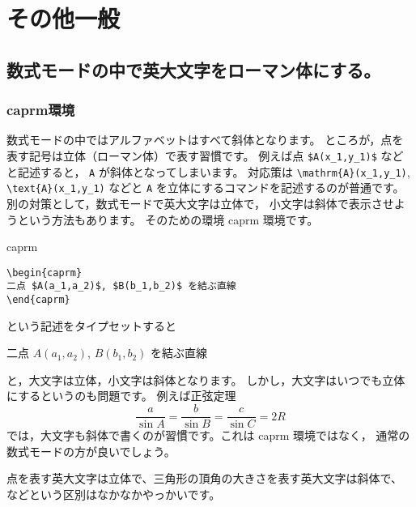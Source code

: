\documentclass[fleqn,a4j]{jarticle}
\begin{document}
\section{その他一般}
\subsection{数式モードの中で英大文字をローマン体にする。}
\subsubsection{\textsf{caprm}環境}
数式モードの中ではアルファベットはすべて斜体となります。
ところが，点を表す記号は立体（ローマン体）で表す習慣です。
例えば点 \verb/$A(x_1,y_1)$/ などと記述すると，
\texttt{A} が斜体となってしまいます。
対応策は \verb/\mathrm{A}(x_1,y_1)/, \verb/\text{A}(x_1,y_1)/
などと \texttt{A} を立体にするコマンドを記述するのが普通です。
別の対策として，数式モードで英大文字は立体で，
小文字は斜体で表示させようという方法もあります。
そのための環境 \textsf{caprm} 環境です。

\begin{itembox}{\textsf{caprm}}
\begin{verbatim}
\begin{caprm}
二点 $A(a_1,a_2)$, $B(b_1,b_2)$ を結ぶ直線
\end{caprm}
\end{verbatim}
\end{itembox}

という記述をタイプセットすると\vspace{1ex}

\begin{caprm}
\noindent
\begin{shadebox}
二点 $A(a_1,a_2)$, $B(b_1,b_2)$ を結ぶ直線
\end{shadebox}
\end{caprm}\vspace{1ex}

\noindent
と，大文字は立体，小文字は斜体となります。
しかし，大文字はいつでも立体にするというのも問題です。
例えば正弦定理
\[\frac{a}{\sin A}=\frac{b}{\sin B}=\frac{c}{\sin C}=2R \]
では，大文字も斜体で書くのが習慣です。これは \textsf{caprm} 環境ではなく，
通常の数式モードの方が良いでしょう。

点を表す英大文字は立体で、三角形の頂角の大きさを表す英大文字は斜体で、
などという区別はなかなかやっかいです。
\end{document}
